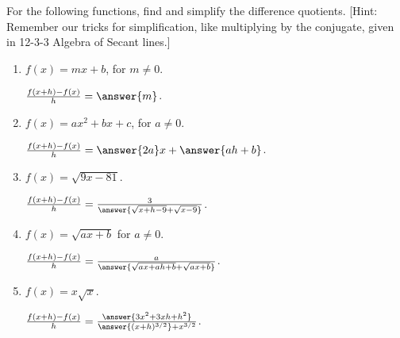 \documentclass{ximera}
\author{Elizabeth Campolongo}
\begin{document}
\begin{exercise}
For the following functions,
find and simplify the difference quotients. [Hint: Remember our tricks for simplification, like multiplying by the conjugate, given in 12-3-3 Algebra of Secant lines.]

\begin{enumerate}
\item $f(x)= mx + b$, for $m \neq 0$.

$\frac{f(x+h)-f(x)}{h} = \answer{m}$.  

\item $f(x)= ax^2 + bx+c$, for $a \neq 0$.

$\frac{f(x+h)-f(x)}{h} = \answer{2a}x + \answer{ah +b}$.  


\item $f(x)= \sqrt{9x-81}$.

$\frac{f(x+h)-f(x)}{h} = \frac{3}{\answer{\sqrt{x+h-9} + \sqrt{x-9}}}$.  

\item $f(x)= \sqrt{ax+b}$ for $a \neq 0$.

$\frac{f(x+h)-f(x)}{h} = \frac{a}{\answer{\sqrt{ax+ah+b} + \sqrt{ax+b}}}$.  

\item $f(x)= x\sqrt{x}$.

$\frac{f(x+h)-f(x)}{h} = \frac{\answer{3x^2+3xh+h^2}}{\answer{(x+h)^{3/2}} +x^{3/2}}$.  



\end{enumerate}
\end{exercise}
\end{document}
